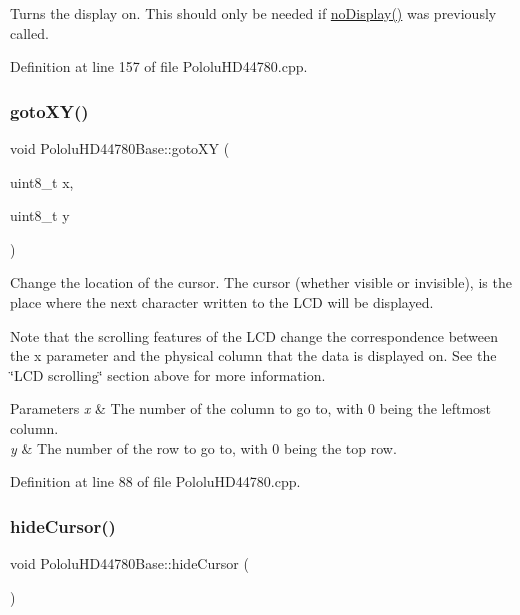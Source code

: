 Turns the display on. This should only be needed if \hyperlink{class_pololu_h_d44780_base_abc2d4e126017565c2a0cf2aac67870a0}{no\+Display()} was previously called. 

Definition at line 157 of file Pololu\+H\+D44780.\+cpp.

\mbox{\label{class_pololu_h_d44780_base_a4886df8c888669cf71675072689ace9b}} 
\subsubsection{\texorpdfstring{goto\+X\+Y()}{gotoXY()}}
{\footnotesize\ttfamily void Pololu\+H\+D44780\+Base\+::goto\+XY (\begin{DoxyParamCaption}\item[{uint8\+\_\+t}]{x,  }\item[{uint8\+\_\+t}]{y }\end{DoxyParamCaption})\hspace{0.3cm}{\ttfamily [inherited]}}

Change the location of the cursor. The cursor (whether visible or invisible), is the place where the next character written to the L\+CD will be displayed.

Note that the scrolling features of the L\+CD change the correspondence between the {\ttfamily x} parameter and the physical column that the data is displayed on. See the \char`\"{}\+L\+C\+D scrolling\char`\"{} section above for more information.


\begin{DoxyParams}{Parameters}
{\em x} & The number of the column to go to, with 0 being the leftmost column. \\
\hline
{\em y} & The number of the row to go to, with 0 being the top row. \\
\hline
\end{DoxyParams}


Definition at line 88 of file Pololu\+H\+D44780.\+cpp.

\mbox{\label{class_pololu_h_d44780_base_a1db083d254d251c479a577f29bcdcec8}} 
\subsubsection{\texorpdfstring{hide\+Cursor()}{hideCursor()}}
{\footnotesize\ttfamily void Pololu\+H\+D44780\+Base\+::hide\+Cursor (\begin{DoxyParamCaption}{ }\end{DoxyParamCaption})\hspace{0.3cm}{\ttfamily [inherited]}}

